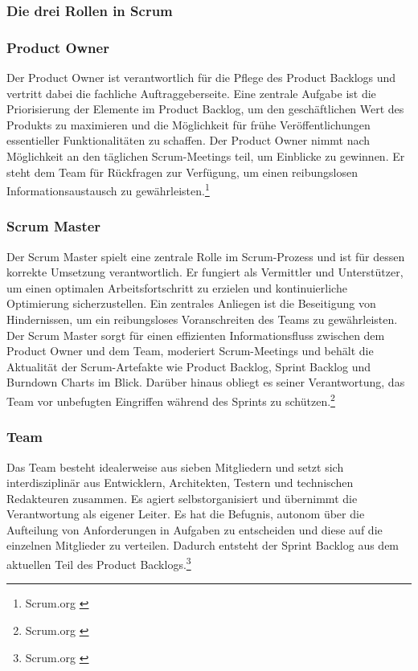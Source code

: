 \subsubsection{Die drei Rollen in Scrum}
\subsubsection*{Product Owner}
Der Product Owner ist verantwortlich für die Pflege des Product Backlogs und vertritt dabei die fachliche Auftraggeberseite.
Eine zentrale Aufgabe ist die Priorisierung der Elemente im Product Backlog, um den geschäftlichen Wert des Produkts zu
maximieren und die Möglichkeit für frühe Veröffentlichungen essentieller Funktionalitäten zu schaffen. Der Product Owner
nimmt nach Möglichkeit an den täglichen Scrum-Meetings teil, um Einblicke zu gewinnen. Er steht dem Team für Rückfragen
zur Verfügung, um einen reibungslosen Informationsaustausch zu gewährleisten.\footnote{Scrum.org \cite{What is a Product Owner}}

\subsubsection*{Scrum Master}
Der Scrum Master spielt eine zentrale Rolle im Scrum-Prozess und ist für dessen korrekte Umsetzung verantwortlich. Er
fungiert als Vermittler und Unterstützer, um einen optimalen Arbeitsfortschritt zu erzielen und kontinuierliche Optimierung
sicherzustellen. Ein zentrales Anliegen ist die Beseitigung von Hindernissen, um ein reibungsloses Voranschreiten des Teams
zu gewährleisten. Der Scrum Master sorgt für einen effizienten Informationsfluss zwischen dem Product Owner und dem Team,
moderiert Scrum-Meetings und behält die Aktualität der Scrum-Artefakte wie Product Backlog, Sprint Backlog und Burndown
Charts im Blick. Darüber hinaus obliegt es seiner Verantwortung, das Team vor unbefugten Eingriffen während des Sprints
zu schützen.\footnote{Scrum.org \cite{What is a Scrum Master}}

\subsubsection*{Team}
Das Team besteht idealerweise aus sieben Mitgliedern und setzt sich interdisziplinär aus Entwicklern, Architekten,
Testern und technischen Redakteuren zusammen. Es agiert selbstorganisiert und übernimmt die Verantwortung als eigener
Leiter. Es hat die Befugnis, autonom über die Aufteilung von Anforderungen in Aufgaben zu entscheiden und diese auf die
einzelnen Mitglieder zu verteilen. Dadurch entsteht der Sprint Backlog aus dem aktuellen Teil des Product Backlogs.\footnote{Scrum.org \cite{What is a developer}}

